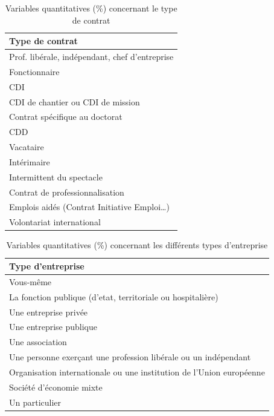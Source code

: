 \documentclass[12pt, a4paper, titlepage, table]{article}
\begin{document}
\begin{table}[H]
	\centering
	\begin{tabularx}{\textwidth}{|X|}
		\hline
		\textbf{Type de contrat} \\
		\hline
		Prof. libérale, indépendant, chef d’entreprise \\
		\hline
		Fonctionnaire \\
		\hline
		CDI \\
		\hline
		CDI de chantier ou CDI de mission \\
		\hline
		Contrat spécifique au doctorat \\
		\hline
		CDD \\
		\hline
		Vacataire \\
		\hline
		Intérimaire \\
		\hline
		Intermittent du spectacle \\
		\hline
		Contrat de professionnalisation \\
		\hline
		Emplois aidés (Contrat Initiative Emploi…) \\
		\hline
		Volontariat international \\
		\hline
	\end{tabularx}
	\caption{Variables quantitatives (\%) concernant le type de contrat}
	\label{tab:variables_sans_numeros}
\end{table}

\begin{table}[H]
	\centering
	\begin{tabularx}{\textwidth}{|X|}
		\hline
		\textbf{Type d'entreprise} \\
		\hline
		Vous-même \\
		\hline
		La fonction publique (d'etat, territoriale ou hospitalière) \\
		\hline
		Une entreprise privée \\
		\hline
		Une entreprise publique \\
		\hline
		Une association \\
		\hline
		Une personne exerçant une profession libérale ou un indépendant \\
		\hline
		Organisation internationale ou une institution de l'Union européenne \\
		\hline
		Société d'économie mixte \\
		\hline
		Un particulier \\
		\hline
	\end{tabularx}
	\caption{Variables quantitatives (\%) concernant les différents types d'entreprise}
	\label{tab:variables_liste2}
\end{table}
\end{document}
